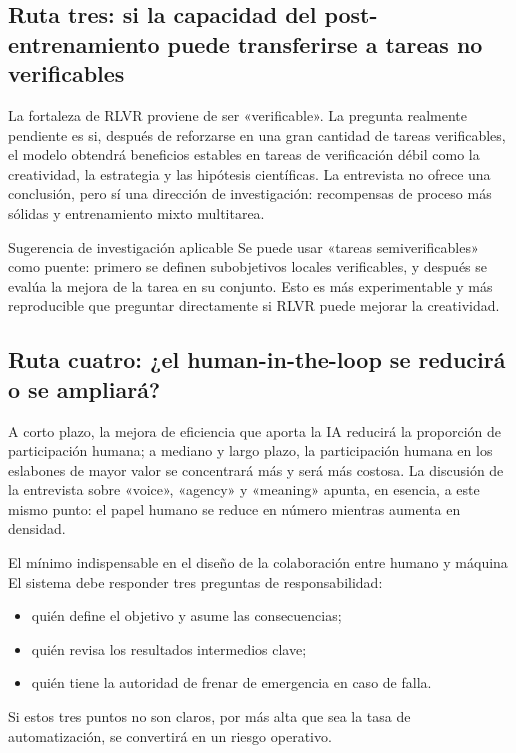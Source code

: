\documentclass[a4paper]{article}
\begin{document}
\subsection{Ruta tres: si la capacidad del post-entrenamiento puede transferirse a tareas no verificables}

La fortaleza de RLVR proviene de ser «verificable». La pregunta realmente pendiente es si, después de reforzarse en una gran cantidad de tareas verificables, el modelo obtendrá beneficios estables en tareas de verificación débil como la creatividad, la estrategia y las hipótesis científicas. La entrevista no ofrece una conclusión, pero sí una dirección de investigación: recompensas de proceso más sólidas y entrenamiento mixto multitarea.

\begin{knowledgebox}{Sugerencia de investigación aplicable}
Se puede usar «tareas semiverificables» como puente: primero se definen subobjetivos locales verificables, y después se evalúa la mejora de la tarea en su conjunto. Esto es más experimentable y más reproducible que preguntar directamente si RLVR puede mejorar la creatividad.
\end{knowledgebox}

\subsection{Ruta cuatro: ¿el human-in-the-loop se reducirá o se ampliará?}

A corto plazo, la mejora de eficiencia que aporta la IA reducirá la proporción de participación humana; a mediano y largo plazo, la participación humana en los eslabones de mayor valor se concentrará más y será más costosa. La discusión de la entrevista sobre «voice», «agency» y «meaning» apunta, en esencia, a este mismo punto: el papel humano se reduce en número mientras aumenta en densidad.

\begin{importantbox}{El mínimo indispensable en el diseño de la colaboración entre humano y máquina}
El sistema debe responder tres preguntas de responsabilidad:
\begin{itemize}[leftmargin=1.5em]
    \item quién define el objetivo y asume las consecuencias;
    \item quién revisa los resultados intermedios clave;
    \item quién tiene la autoridad de frenar de emergencia en caso de falla.
\end{itemize}
Si estos tres puntos no son claros, por más alta que sea la tasa de automatización, se convertirá en un riesgo operativo.
\end{importantbox}
\end{document}

